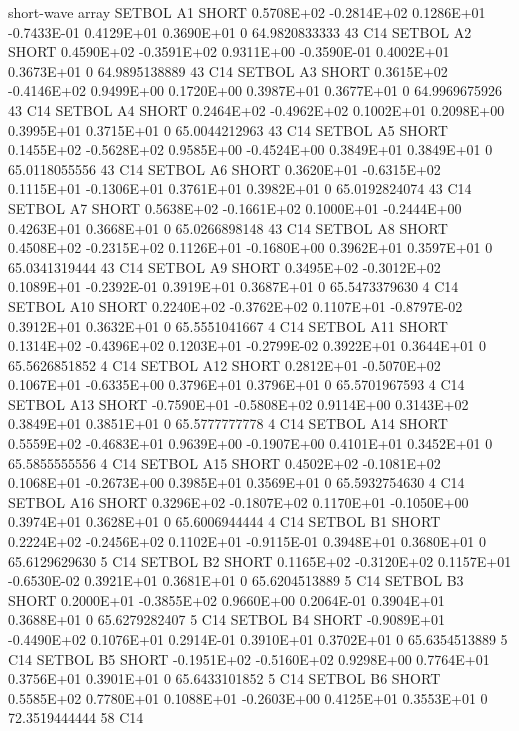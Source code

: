 \documentclass[twoside,11pt,nolof]{starlink}
\begin{document}
\begin{landscape}
\begin{small}
\begin{terminalv}
{{{{{ short-wave array
 SETBOL A1  SHORT     0.5708E+02 -0.2814E+02  0.1286E+01 -0.7433E-01  0.4129E+01  0.3690E+01  0  64.9820833333  43 C14
 SETBOL A2  SHORT     0.4590E+02 -0.3591E+02  0.9311E+00 -0.3590E-01  0.4002E+01  0.3673E+01  0  64.9895138889  43 C14
 SETBOL A3  SHORT     0.3615E+02 -0.4146E+02  0.9499E+00  0.1720E+00  0.3987E+01  0.3677E+01  0  64.9969675926  43 C14
 SETBOL A4  SHORT     0.2464E+02 -0.4962E+02  0.1002E+01  0.2098E+00  0.3995E+01  0.3715E+01  0  65.0044212963  43 C14
 SETBOL A5  SHORT     0.1455E+02 -0.5628E+02  0.9585E+00 -0.4524E+00  0.3849E+01  0.3849E+01  0  65.0118055556  43 C14
 SETBOL A6  SHORT     0.3620E+01 -0.6315E+02  0.1115E+01 -0.1306E+01  0.3761E+01  0.3982E+01  0  65.0192824074  43 C14
 SETBOL A7  SHORT     0.5638E+02 -0.1661E+02  0.1000E+01 -0.2444E+00  0.4263E+01  0.3668E+01  0  65.0266898148  43 C14
 SETBOL A8  SHORT     0.4508E+02 -0.2315E+02  0.1126E+01 -0.1680E+00  0.3962E+01  0.3597E+01  0  65.0341319444  43 C14
 SETBOL A9  SHORT     0.3495E+02 -0.3012E+02  0.1089E+01 -0.2392E-01  0.3919E+01  0.3687E+01  0  65.5473379630   4 C14
 SETBOL A10 SHORT     0.2240E+02 -0.3762E+02  0.1107E+01 -0.8797E-02  0.3912E+01  0.3632E+01  0  65.5551041667   4 C14
 SETBOL A11 SHORT     0.1314E+02 -0.4396E+02  0.1203E+01 -0.2799E-02  0.3922E+01  0.3644E+01  0  65.5626851852   4 C14
 SETBOL A12 SHORT     0.2812E+01 -0.5070E+02  0.1067E+01 -0.6335E+00  0.3796E+01  0.3796E+01  0  65.5701967593   4 C14
 SETBOL A13 SHORT    -0.7590E+01 -0.5808E+02  0.9114E+00  0.3143E+02  0.3849E+01  0.3851E+01  0  65.5777777778   4 C14
 SETBOL A14 SHORT     0.5559E+02 -0.4683E+01  0.9639E+00 -0.1907E+00  0.4101E+01  0.3452E+01  0  65.5855555556   4 C14
 SETBOL A15 SHORT     0.4502E+02 -0.1081E+02  0.1068E+01 -0.2673E+00  0.3985E+01  0.3569E+01  0  65.5932754630   4 C14
 SETBOL A16 SHORT     0.3296E+02 -0.1807E+02  0.1170E+01 -0.1050E+00  0.3974E+01  0.3628E+01  0  65.6006944444   4 C14
 SETBOL B1  SHORT     0.2224E+02 -0.2456E+02  0.1102E+01 -0.9115E-01  0.3948E+01  0.3680E+01  0  65.6129629630   5 C14
 SETBOL B2  SHORT     0.1165E+02 -0.3120E+02  0.1157E+01 -0.6530E-02  0.3921E+01  0.3681E+01  0  65.6204513889   5 C14
 SETBOL B3  SHORT     0.2000E+01 -0.3855E+02  0.9660E+00  0.2064E-01  0.3904E+01  0.3688E+01  0  65.6279282407   5 C14
 SETBOL B4  SHORT    -0.9089E+01 -0.4490E+02  0.1076E+01  0.2914E-01  0.3910E+01  0.3702E+01  0  65.6354513889   5 C14
 SETBOL B5  SHORT    -0.1951E+02 -0.5160E+02  0.9298E+00  0.7764E+01  0.3756E+01  0.3901E+01  0  65.6433101852   5 C14
 SETBOL B6  SHORT     0.5585E+02  0.7780E+01  0.1088E+01 -0.2603E+00  0.4125E+01  0.3553E+01  0  72.3519444444  58 C14
}}}}}
\end{terminalv}
\end{small}
\end{landscape}
\end{document}
